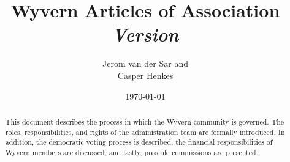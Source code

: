 \documentclass[a4paper]{article}
\title{
    Wyvern Articles of Association\\
    \vspace{10px}
    \large \textit{Version \versionnumber}
}
\author{
    Jerom van der Sar and\\
    Casper Henkes
}
\date{\today}
\begin{document}
\begin{titlepage}
    \maketitle
    \begin{abstract}
        This document describes the process in which the Wyvern community is governed. The roles, responsibilities, and rights of the administration team are formally introduced. In addition, the democratic voting process is described, the financial responsibilities of Wyvern members are discussed, and lastly, possible commissions are presented.
    \end{abstract}
\end{titlepage}







\end{document}
